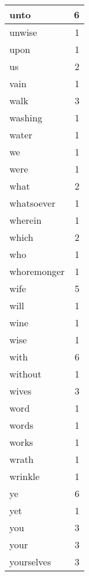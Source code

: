 \begin{center}
\begin{longtable}{l|r}
unto & 6\\ \hline 
unwise & 1\\ \hline 
upon & 1\\ \hline 
us & 2\\ \hline 
vain & 1\\ \hline 
walk & 3\\ \hline 
washing & 1\\ \hline 
water & 1\\ \hline 
we & 1\\ \hline 
were & 1\\ \hline 
what & 2\\ \hline 
whatsoever & 1\\ \hline 
wherein & 1\\ \hline 
which & 2\\ \hline 
who & 1\\ \hline 
whoremonger & 1\\ \hline 
wife & 5\\ \hline 
will & 1\\ \hline 
wine & 1\\ \hline 
wise & 1\\ \hline 
with & 6\\ \hline 
without & 1\\ \hline 
wives & 3\\ \hline 
word & 1\\ \hline 
words & 1\\ \hline 
works & 1\\ \hline 
wrath & 1\\ \hline 
wrinkle & 1\\ \hline 
ye & 6\\ \hline 
yet & 1\\ \hline 
you & 3\\ \hline 
your & 3\\ \hline 
yourselves & 3\\ \hline 
\end{longtable}  
\end{center}  


  
\normalsize  

  
  
